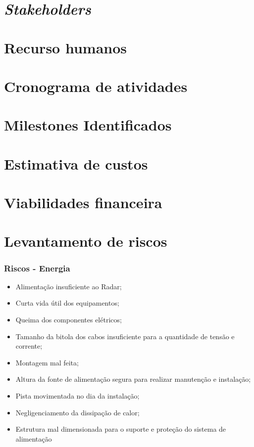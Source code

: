 \section{\emph{Stakeholders}}
\section{Recurso humanos}
\section{Cronograma de atividades}
\section{Milestones Identificados}
\section{Estimativa de custos}
\section{Viabilidades financeira}
\section{Levantamento de riscos}
\subsubsection{Riscos - Energia}
\begin{itemize}
   \item Alimentação insuficiente ao Radar;
   \item Curta vida útil dos equipamentos; 
   \item Queima dos componentes elétricos;
   \item Tamanho da bitola dos cabos insuficiente para a quantidade de tensão e corrente;
   \item Montagem mal feita;
   \item Altura da fonte de alimentação segura para realizar manutenção e instalação;
   \item Pista movimentada no dia da instalação;
   \item Negligenciamento da dissipação de calor;
   \item Estrutura mal dimensionada para o suporte e proteção do sistema de alimentação
 \end{itemize}
